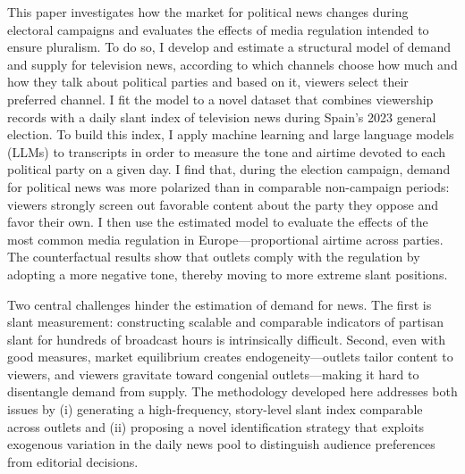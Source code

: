 \documentclass[12pt]{article}
\begin{document}
This paper investigates how the market for political news changes during electoral campaigns and evaluates the effects of media regulation intended to ensure pluralism. To do so, I develop and estimate a structural model of demand and supply for television news, according to which channels choose how much and how they talk about political parties and based on it, viewers select their preferred channel. I fit the model to a novel dataset that combines viewership records with a daily slant index of television news during Spain's 2023 general election. To build this index, I apply machine learning and large language models (LLMs) to  transcripts in order to measure the tone and airtime devoted to each political party on a given day.  I find that, during the election campaign, demand for political news was more polarized than in comparable non-campaign periods: viewers strongly screen out favorable content about the party they oppose and favor their own. I then use the estimated model to evaluate the effects of the most common media regulation in Europe—proportional airtime across parties. The counterfactual results show that outlets comply with the regulation by adopting a more negative tone, thereby moving to more extreme slant positions. 




	
	
	Two central challenges hinder the estimation of demand for news. The first is slant measurement: constructing scalable and comparable indicators of partisan slant for hundreds of broadcast hours is intrinsically difficult. Second, even with good measures, market equilibrium creates endogeneity—outlets tailor content to viewers, and viewers gravitate toward congenial outlets—making it hard to disentangle demand from supply. The methodology developed here addresses both issues by (i) generating a high-frequency, story-level slant index comparable across outlets and (ii) proposing a novel identification strategy that exploits exogenous variation in the daily news pool to distinguish audience preferences from editorial decisions.
	
\end{document}
